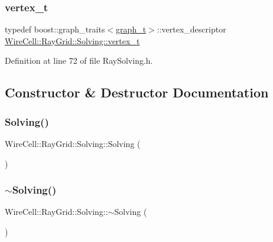 \subsubsection{\texorpdfstring{vertex\+\_\+t}{vertex\_t}}
{\footnotesize\ttfamily typedef boost\+::graph\+\_\+traits$<$\hyperlink{class_wire_cell_1_1_ray_grid_1_1_solving_ac9cb5afd9b0590c4671a239347dc5e34}{graph\+\_\+t}$>$\+::vertex\+\_\+descriptor \hyperlink{class_wire_cell_1_1_ray_grid_1_1_solving_a2bd8328227317e855f9e382a4e7f3201}{Wire\+Cell\+::\+Ray\+Grid\+::\+Solving\+::vertex\+\_\+t}}



Definition at line 72 of file Ray\+Solving.\+h.



\subsection{Constructor \& Destructor Documentation}
\mbox{\label{class_wire_cell_1_1_ray_grid_1_1_solving_aed2c404897e77942c2c38bec80b4cd73}} 
\subsubsection{\texorpdfstring{Solving()}{Solving()}}
{\footnotesize\ttfamily Wire\+Cell\+::\+Ray\+Grid\+::\+Solving\+::\+Solving (\begin{DoxyParamCaption}{ }\end{DoxyParamCaption})\hspace{0.3cm}{\ttfamily [default]}}

\mbox{\label{class_wire_cell_1_1_ray_grid_1_1_solving_a631b4d10c93ab68c3e80d8f98a63cb04}} 
\subsubsection{\texorpdfstring{$\sim$\+Solving()}{~Solving()}}
{\footnotesize\ttfamily Wire\+Cell\+::\+Ray\+Grid\+::\+Solving\+::$\sim$\+Solving (\begin{DoxyParamCaption}{ }\end{DoxyParamCaption})\hspace{0.3cm}{\ttfamily [default]}}



